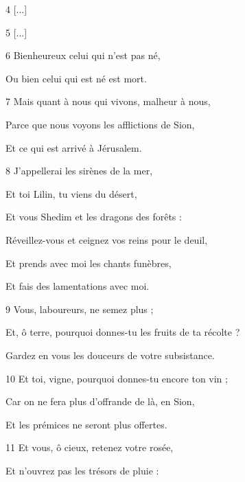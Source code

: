 \par 4 [...]

\par 5 [...]

\par 6 Bienheureux celui qui n'est pas né,

\par Ou bien celui qui est né est mort.

\par 7 Mais quant à nous qui vivons, malheur à nous,

\par Parce que nous voyons les afflictions de Sion,

\par Et ce qui est arrivé à Jérusalem.

\par 8 J'appellerai les sirènes de la mer,

\par Et toi Lilin, tu viens du désert,

\par Et vous Shedim et les dragons des forêts :

\par Réveillez-vous et ceignez vos reins pour le deuil,

\par Et prends avec moi les chants funèbres,

\par Et fais des lamentations avec moi.

\par 9 Vous, laboureurs, ne semez plus ;

\par Et, ô terre, pourquoi donnes-tu les fruits de ta récolte ?

\par Gardez en vous les douceurs de votre subsistance.

\par 10 Et toi, vigne, pourquoi donnes-tu encore ton vin ;

\par Car on ne fera plus d'offrande de là, en Sion,

\par Et les prémices ne seront plus offertes.

\par 11 Et vous, ô cieux, retenez votre rosée,

\par Et n'ouvrez pas les trésors de pluie :

